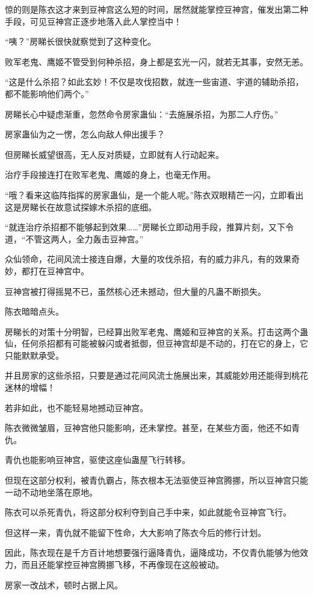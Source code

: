 \begin{this_body}
惊的则是陈衣这才来到豆神宫这么短的时间，居然就能掌控豆神宫，催发出第二种手段，可见豆神宫正逐步地落入此人掌控当中！

“咦？”房睇长很快就察觉到了这种变化。

败军老鬼、鹰姬不管受到何种杀招，身上都是玄光一闪，就若无其事，安然无恙。

“这是什么杀招？如此玄妙！不仅是攻伐招数，就连一些宙道、宇道的辅助杀招，都不能影响他们两个。”

房睇长心中疑虑渐重，忽然命令房家蛊仙：“去施展杀招，为那二人疗伤。”

房家蛊仙为之一愣，怎么向敌人伸出援手？

但房睇长威望很高，无人反对质疑，立即就有人行动起来。

治疗手段接连打在败军老鬼、鹰姬的身上，也毫无作用。

“哦？看来这临阵指挥的房家蛊仙，是一个能人呢。”陈衣双眼精芒一闪，立即看出这是房睇长在故意试探嫁木杀招的底细。

“就连治疗杀招都不能够起到效果……”房睇长立即动用手段，推算片刻，又下令道，“不管这两人，全力轰击豆神宫。”

众仙领命，花间风流士接连自爆，大量的攻伐杀招，有的威力非凡，有的效果奇妙，都打在豆神宫中。

豆神宫被打得摇晃不已，虽然核心还未撼动，但大量的凡蛊不断损失。

陈衣暗暗点头。

房睇长的对策十分明智，已经算出败军老鬼、鹰姬和豆神宫的关系。打击这两个蛊仙，任何杀招都有可能被躲闪或者抵御，但豆神宫却是不动的，打在它的身上，它只能默默承受。

并且房家的这些杀招，只要是通过花间风流士施展出来，其威能妙用还能得到桃花迷林的增幅！

若非如此，也不能轻易地撼动豆神宫。

陈衣微微皱眉，豆神宫他只能影响，还未掌控。甚至，在某些方面，他还不如青仇。

青仇也能影响豆神宫，驱使这座仙蛊屋飞行转移。

但现在这部分权利，被青仇霸占，陈衣根本无法驱使豆神宫腾挪，所以豆神宫只能一动不动地坐落在原地。

陈衣可以杀死青仇，将这部分权利夺到自己手中来，如此就能令豆神宫飞行。

但这样一来，青仇就不能留下性命，大大影响了陈衣今后的修行计划。

因此，陈衣现在是千方百计地想要强行逼降青仇，逼降成功，不仅青仇能够为他效力，而且还能掌控豆神宫腾挪飞移，不再像现在这般被动。

房家一改战术，顿时占据上风。


\end{this_body}
